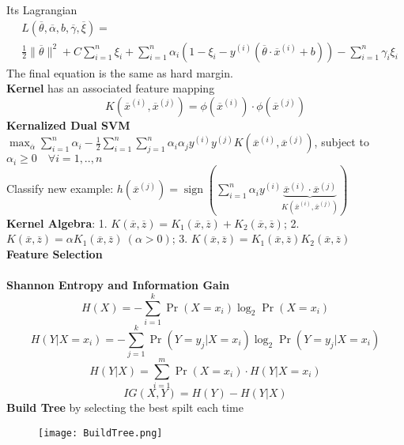 \documentclass[10pt, letterpaper]{article}
\begin{document}
\begin{multicols*}{2}
Its Lagrangian
\vspace{-2ex}
\begin{align*}
    &L(\overline{\theta}, \overline{\alpha}, b, \overline{\gamma}, \overline{\xi})=\\
    &\frac{1}{2}\|\overline{\theta}\|^{2}+C \sum_{i=1}^{n} \xi_{i}+\sum_{i=1}^{n} \alpha_{i}\left(1-\xi_{i}-y^{(i)}\left(\overline{\theta} \cdot \overline{x}^{(i)}+b\right)\right)-\sum_{i=1}^{n} \gamma_{i} \xi_{i}
\end{align*}
The final equation is the same as hard margin.\\
\textbf{Kernel} has an associated feature mapping
\vspace{-2ex}
\[K\left(\overline{x}^{(i)}, \overline{x}^{(j)}\right)=\phi\left(\overline{x}^{(i)}\right) \cdot \phi\left(\overline{x}^{(j)}\right)\]
\textbf{Kernalized Dual SVM}\\
$\max _{\overline{\alpha}} \sum_{i=1}^{n} \alpha_{i}-\frac{1}{2} \sum_{i=1}^{n} \sum_{j=1}^{n} \alpha_{i} \alpha_{j} y^{(i)} y^{(j)}K\left(\overline{x}^{(i)}, \overline{x}^{(j)}\right)$, subject to $\alpha_{i} \geq 0 \quad \forall i=1, . ., n$\\
Classify new example: $h\left(\overline{x}^{(j)}\right)=\operatorname{sign}(\sum_{i=1}^{n} \alpha_{i} y^{(i)}{\underbrace{\overline{x}^{(i)} \cdot \overline{x}^{(j)}}_{K(\overline{x}^{(i)}, \overline{x}^{(j)})}})$\\
\textbf{Kernel Algebra}: 1. $K(\overline{x}, \overline{z})=K_{1}(\overline{x}, \overline{z})+K_{2}(\overline{x}, \overline{z})$; 2.  $K(\overline{x}, \overline{z})=\alpha K_{1}(\overline{x}, \overline{z})~(\alpha > 0)$; 3. $K(\overline{x}, \overline{z})=K_{1}(\overline{x}, \overline{z}) K_{2}(\overline{x}, \overline{z})$\\
\textbf{Feature Selection}\\
\\
\textbf{Shannon Entropy and Information Gain}
\vspace{-2ex}
\[H(X)=-\sum_{i=1}^k \Pr\left(X=x_{i}\right) \log _{2} \Pr\left(X=x_{i}\right)\]
\vspace{-2ex}
\[H(Y|X=x_i)=-\sum_{j=1}^k \Pr\left(Y=y_j|X=x_{i}\right) \log _{2} \Pr\left(Y=y_j|X=x_{i}\right)\]
\vspace{-2ex}
\[H(Y|X) = \sum_{i=1}^m\Pr(X=x_i)\cdot H(Y|X=x_i)\]
\vspace{-2ex}
\[IG(X, Y) = H(Y) - H(Y|X)\]
\textbf{Build Tree} by selecting the best spilt each time
\begin{figure}[H]
    \centering
    \texttt{[image: BuildTree.png]}

\end{figure}
\end{multicols*}
\end{document}
